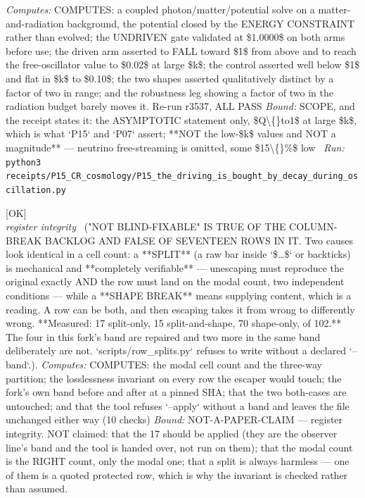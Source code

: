 \begin{description}
\emph{Computes:} COMPUTES: a coupled photon/matter/potential solve on a matter-and-radiation background, the potential closed by the ENERGY CONSTRAINT rather than evolved; the UNDRIVEN gate validated at \$1.0000\$ on both arms before use; the driven arm asserted to FALL toward \$1\$ from above and to reach the free-oscillator value to \$0.02\$ at large \$k\$; the control asserted well below \$1\$ and flat in \$k\$ to \$0.10\$; the two shapes asserted qualitatively distinct by a factor of two in range; and the robustness leg showing a factor of two in the radiation budget barely moves it. Re-run r3537, ALL PASS
 \emph{Bound:} SCOPE, and the receipt states it: the ASYMPTOTIC statement only, \$Q\textbackslash\{\}to1\$ at large \$k\$, which is what `P15` and `P07` assert; **NOT the low-\$k\$ values and NOT a magnitude** --- neutrino free-streaming is omitted, some \$15\textbackslash\{\}\%\$ low
\ \emph{Run:} \texttt{python3 receipts/P15\_CR\_cosmology/P15\_the\_driving\_is\_bought\_by\_decay\_during\_oscillation.py}
\item[\label{rcpt:S1_not_blind_fixable_is_true_of_the_backlog_and_false_of_seventeen_rows_in_it}\texttt{S1\_not\_blind\_fixable\_is\_true\_of\_the\_backlog\_and\_false\_of\_seventeen\_rows\_in\_it}]\hfill\textsf{[OK]}\\
\textit{register integrity} \ ("NOT BLIND-FIXABLE" IS TRUE OF THE COLUMN-BREAK BACKLOG AND FALSE OF SEVENTEEN ROWS IN IT. Two causes look identical in a cell count: a **SPLIT** (a raw bar inside `\$\ldots{}\$` or backticks) is mechanical and **completely verifiable** --- unescaping must reproduce the original exactly AND the row must land on the modal count, two independent conditions --- while a **SHAPE BREAK** means supplying content, which is a reading. A row can be both, and then escaping takes it from wrong to differently wrong. **Measured: 17 split-only, 15 split-and-shape, 70 shape-only, of 102.** The four in this fork's band are repaired and two more in the same band deliberately are not. `scripts/row\_splits.py` refuses to write without a declared `--band`.). 
\emph{Computes:} COMPUTES: the modal cell count and the three-way partition; the losslessness invariant on every row the escaper would touch; the fork's own band before and after at a pinned SHA; that the two both-cases are untouched; and that the tool refuses `--apply` without a band and leaves the file unchanged either way (10 checks)
 \emph{Bound:} NOT-A-PAPER-CLAIM --- register integrity. NOT claimed: that the 17 should be applied (they are the observer line's band and the tool is handed over, not run on them); that the modal count is the RIGHT count, only the modal one; that a split is always harmless --- one of them is a quoted protected row, which is why the invariant is checked rather than assumed.

\end{description}
